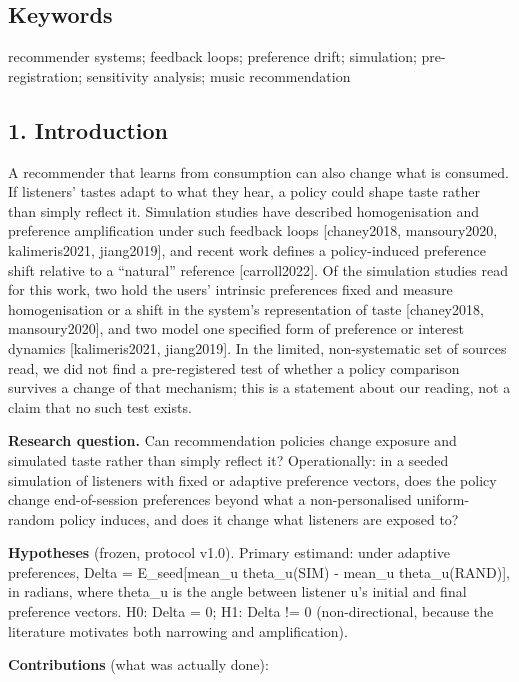 \documentclass[
]{article}
\begin{document}
\subsection{Keywords}\label{keywords}

recommender systems; feedback loops; preference drift; simulation;
pre-registration; sensitivity analysis; music recommendation

\subsection{1. Introduction}\label{introduction}

A recommender that learns from consumption can also change what is
consumed. If listeners' tastes adapt to what they hear, a policy could
shape taste rather than simply reflect it. Simulation studies have
described homogenisation and preference amplification under such
feedback loops {[}chaney2018, mansoury2020, kalimeris2021, jiang2019{]},
and recent work defines a policy-induced preference shift relative to a
``natural'' reference {[}carroll2022{]}. Of the simulation studies read
for this work, two hold the users' intrinsic preferences fixed and
measure homogenisation or a shift in the system's representation of
taste {[}chaney2018, mansoury2020{]}, and two model one specified form
of preference or interest dynamics {[}kalimeris2021, jiang2019{]}. In
the limited, non-systematic set of sources read, we did not find a
pre-registered test of whether a policy comparison survives a change of
that mechanism; this is a statement about our reading, not a claim that
no such test exists.

\textbf{Research question.} Can recommendation policies change exposure
and simulated taste rather than simply reflect it? Operationally: in a
seeded simulation of listeners with fixed or adaptive preference
vectors, does the policy change end-of-session preferences beyond what a
non-personalised uniform-random policy induces, and does it change what
listeners are exposed to?

\textbf{Hypotheses} (frozen, protocol v1.0). Primary estimand: under
adaptive preferences, Delta = E\_seed{[}mean\_u theta\_u(SIM) - mean\_u
theta\_u(RAND){]}, in radians, where theta\_u is the angle between
listener u's initial and final preference vectors. H0: Delta = 0; H1:
Delta != 0 (non-directional, because the literature motivates both
narrowing and amplification).

\textbf{Contributions} (what was actually done):
\end{document}

